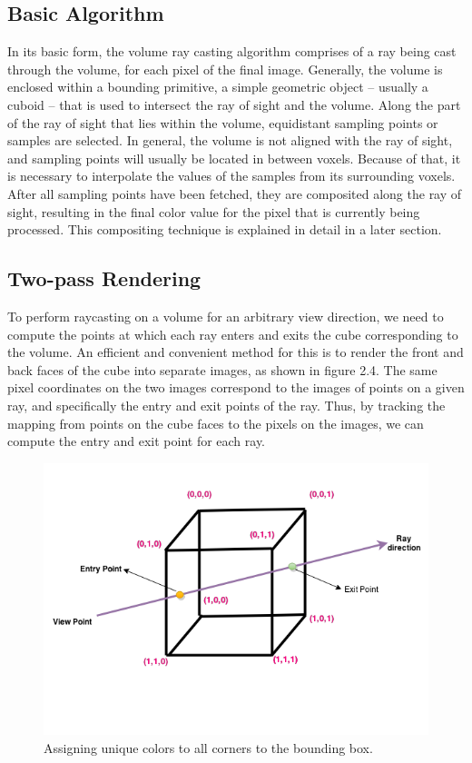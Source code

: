 \subsection{Basic Algorithm}

In its basic form, the volume ray casting algorithm comprises of a ray being cast through the volume, for each pixel of the final image. Generally, the volume is enclosed within a bounding primitive, a simple geometric object -- usually a cuboid -- that is used to intersect the ray of sight and the volume. Along the part of the ray of sight that lies within the volume, equidistant sampling points or samples are selected. In general, the volume is not aligned with the ray of sight, and sampling points will usually be located in between voxels. Because of that, it is necessary to interpolate the values of the samples from its surrounding voxels. After all sampling points have been fetched, they are composited along the ray of sight, resulting in the final color value for the pixel that is currently being processed. This compositing technique is explained in detail in a later section.

\subsection{Two-pass Rendering}

To perform raycasting on  a volume for an arbitrary view direction, we need to compute the points at which each ray enters and exits the cube corresponding to  the volume. An efficient and convenient method for this is to render the front and back faces of the cube into separate images, as shown in figure 2.4. The same pixel coordinates on the two images correspond to the images of points on a given ray, and specifically the entry and exit points of the ray. Thus, by tracking the mapping from points on the cube faces to the pixels on the images, we can compute the entry and exit point for each ray. \\



\begin{figure}
\centering
\includegraphics[width=320pt]{Images/cube.png}
\caption{\label{fig:ray_cast1.jpg} Assigning unique colors to all corners to the bounding box.}
\end{figure}


